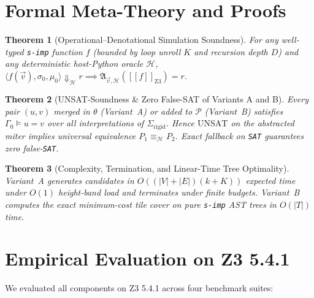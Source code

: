 \documentclass[11pt,a4paper]{article}
\newtheorem{theorem}{Theorem}[section]
\newcommand{\sem}[1]{[\![#1]\!]}
\begin{document}
\section{Formal Meta-Theory and Proofs}
\label{sec:metatheory}

\begin{theorem}[Operational--Denotational Simulation Soundness]
For any well-typed \texttt{s-imp} function $f$ (bounded by loop unroll $K$ and recursion depth $D$) and any deterministic host-Python oracle $\mathcal{H}$, $\langle f(\vec{v}), \sigma_0, \mu_0 \rangle \Downarrow_{\mathcal{H}} r \implies \mathfrak{A}_{\vec{v}, \mathcal{H}}(\sem{f}_{\text{Z3}}) = r$.
\end{theorem}

\begin{theorem}[UNSAT-Soundness \& Zero False-SAT of Variants A and B]
Every pair $(u, v)$ merged in $\theta$ (Variant~A) or added to $\mathcal{P}$ (Variant~B) satisfies $\Gamma_0 \models u = v$ over all interpretations of $\Sigma_{\text{rigid}}$. Hence $\mathrm{UNSAT}$ on the abstracted miter implies universal equivalence $P_1 \equiv_{\mathcal{H}} P_2$. Exact fallback on \texttt{SAT} guarantees zero false-\texttt{SAT}.
\end{theorem}

\begin{theorem}[Complexity, Termination, and Linear-Time Tree Optimality]
Variant~A generates candidates in $O((|V|+|E|)(k+K))$ expected time under $O(1)$ height-band load and terminates under finite budgets. Variant~B computes the exact minimum-cost tile cover on pure \texttt{s-imp} AST trees in $O(|T|)$ time.
\end{theorem}

\section{Empirical Evaluation on Z3 5.4.1}
\label{sec:eval}

We evaluated all components on Z3 5.4.1 across four benchmark suites:
\end{document}
